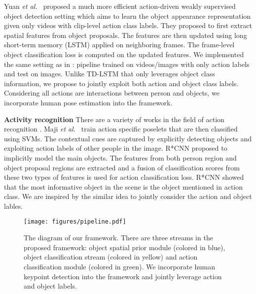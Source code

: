 \documentclass[10pt,twocolumn,letterpaper]{article}
\def\etal{\emph{et al.}}
\begin{document}
Yuan \etal~\cite{yuan2017temporal} proposed a much more efficient action-driven weakly supervised object detection setting which aims to learn the object appearance representation given only videos with clip-level action class labels. They proposed to first extract spatial features from object proposals. The features are then updated using long short-term memory (LSTM) \cite{hochreiter1997long} applied on neighboring frames. The frame-level object classification loss is computed on the updated features. We implemented the same setting as in \cite{yuan2017temporal}: pipeline trained on videos/images with only action labels and test on images. Unlike TD-LSTM \cite{yuan2017temporal} that only leverages object class information, we propose to jointly exploit both action and object class labels. Considering all actions are interactions between person and objects, we incorporate human pose estimation into the framework.

\textbf{Activity recognition}
There are a variety of works in the field of action recognition \cite{wang2017untrimmednets,maji2011action,gkioxari2015contextual,alayrac2017joint,gao2017turn,gan2016webly,gao2017cascaded}. Maji \etal~\cite{maji2011action} train action specific poselets that are then classified using SVMs. The contextual cues are captured by explicitly detecting objects and exploiting action labels of other people in the image. R*CNN \cite{gkioxari2015contextual} proposed to implicitly model the main objects. The features from both person region and object proposal regions are extracted and a fusion of classification scores from these two types of features is used for action classification loss. R*CNN showed that the most informative object in the scene is the object mentioned in action class. We are inspired by the similar idea to jointly consider the action and object lables.


\begin{figure*}[ht!]
\centering
\vspace{-0.5\baselineskip}
\texttt{[image: figures/pipeline.pdf]}
\caption{The diagram of our framework. There are three streams in the proposed framework: object spatial prior module (colored in blue), object classification stream (colored in yellow) and action classification module (colored in green). We incorporate human keypoint detection into the framework and jointly leverage action and object labels.}
\vspace{-1.2\baselineskip}
\label{fig:pipeline}
\end{figure*}
\end{document}

